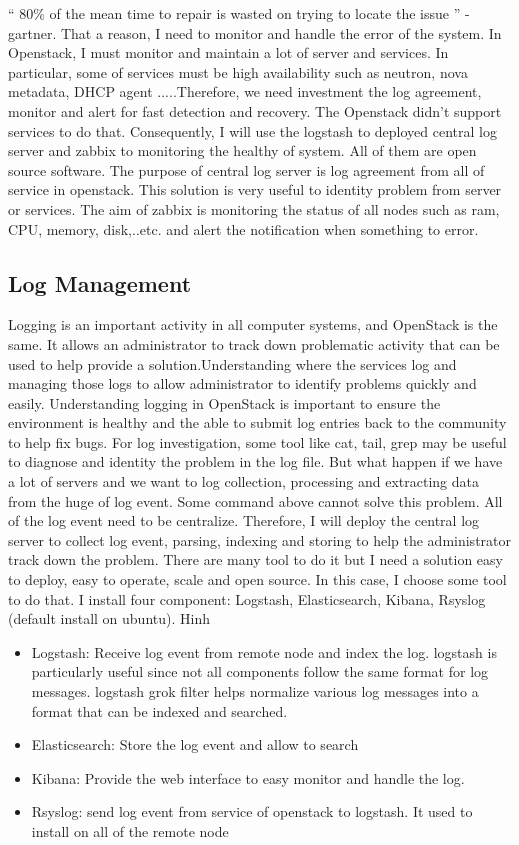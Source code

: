 
	 \enquote{ 80\% of the mean time to repair is wasted on trying to locate the issue } - gartner. That a reason, I need to monitor and handle the error of the system. In Openstack, I must monitor and maintain a lot of server and services. In particular, some of services must be high availability such as neutron, nova metadata, DHCP agent .....Therefore, we need investment the log agreement, monitor and alert for fast detection and recovery. The Openstack didn't support services to do that. Consequently, I will use the logstash to  deployed central log server and zabbix to monitoring the healthy of system. All of them are open source software. The purpose of central log server is log agreement from all of service in openstack. This solution is very useful to identity problem from server or services. The aim of zabbix is monitoring the status of all nodes such as ram, CPU, memory, disk,..etc. and alert the notification when something to error.

\subsection{Log Management}
Logging is an important activity in all computer systems, and OpenStack is the same. It allows an administrator to track down problematic activity that can be used to help provide a solution.Understanding where the services log and managing those logs to allow administrator to identify problems quickly and easily. Understanding logging in OpenStack is important to ensure the  environment is healthy and the able to submit log entries back to the community to help fix bugs. For log investigation, some tool like cat, tail, grep may be useful to diagnose and identity the problem in the log file. But what happen if we have a lot of servers and we want to log collection, processing and extracting data from the huge of log event. Some command above cannot solve this problem. All of the log event need to be centralize. Therefore, I will deploy the central log server to collect log event, parsing, indexing and storing to help the administrator track down the problem. There are many tool to do it but I need a solution easy to deploy, easy to operate, scale and open source. In this case, I choose some tool to do that. I install four component: Logstash, Elasticsearch, Kibana, Rsyslog (default install on ubuntu).
	Hinh
\begin{itemize}
	\item Logstash: Receive log event from remote node and index the log. logstash is particularly useful since not all components follow the same format for log messages. logstash grok filter helps normalize various log messages into a format that can be indexed and searched.
	\item Elasticsearch: Store the log event and allow to search  
	\item Kibana: Provide the web interface to easy monitor and handle the log.
	\item Rsyslog: send log event from service of openstack to logstash. It used to install on all of the remote node 
\end{itemize}
	 
